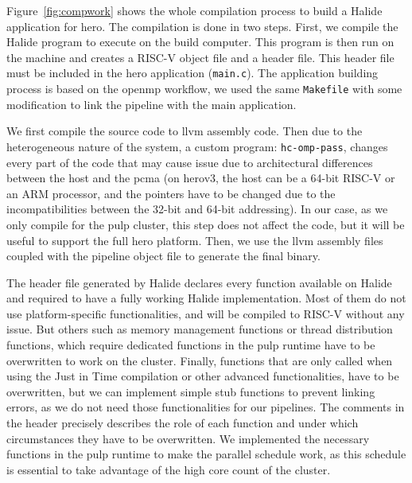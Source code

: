     Figure~\ref{fig:compwork} shows the whole compilation process to build a Halide application for \gls{hero}.
    The compilation is done in two steps. First, we compile the Halide program to execute on the build computer.
    This program is then run on the machine and creates a RISC-V object file and a header file.
    This header file must be included in the \gls{hero} application (\texttt{main.c}).
    The application building process is based on the \gls{openmp} workflow, we used the same \texttt{Makefile} with some modification to link the pipeline with the main application. 

    We first compile the source code to \gls{llvm} assembly code. Then due to the heterogeneous nature of the system, a custom program: \texttt{hc-omp-pass}, changes every part of the code that may cause issue due to architectural differences between the host and the \gls{pcma} (on \gls{hero}v3, the host can be a 64-bit RISC-V or an ARM processor, and the pointers have to be changed due to the incompatibilities between the 32-bit and 64-bit addressing).
    In our case, as we only compile for the \gls{pulp} cluster, this step does not affect the code, but it will be useful to support the full \gls{hero} platform. 
    Then, we use the \gls{llvm} assembly files coupled with the pipeline object file to generate the final binary.


    The header file generated by Halide declares every function available on Halide and required to have a fully working Halide implementation. 
    Most of them do not use platform-specific functionalities, and will be compiled to RISC-V without any issue.
    But others such as memory management functions or thread distribution functions, which require dedicated functions in the \gls{pulp} runtime have to be overwritten to work on the cluster.
    Finally, functions that are only called when using the Just in Time compilation or other advanced functionalities, have to be overwritten, but we can implement simple stub functions to prevent linking errors, as we do not need those functionalities for our pipelines. 
    The comments in the header precisely describes the role of each function and under which circumstances they have to be overwritten.
    We implemented the necessary functions in the \gls{pulp} runtime to make the parallel schedule work, as this schedule is essential to take advantage of the high core count of the cluster.
 
